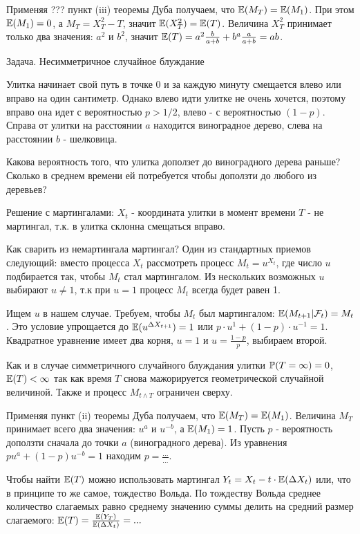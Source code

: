 {Применяя ??? пункт (iii) теоремы Дуба получаем, что $\E(M_{T})=\E(M_{1})$. При этом $\E(M_{1})=0$, а $M_{T}=X_{T}^{2}-T$, значит $\E(X_{T}^{2})=\E(T)$. Величина $X_{T}^{2}$ принимает только два значения: $a^{2}$ и $b^{2}$, значит $\E(T)=a^{2}\frac{b}{a+b}+b^{a}\frac{a}{a+b}=ab$.

Задача. Несимметричное случайное блуждание

Улитка начинает свой путь в точке 0 и за каждую минуту смещается влево или вправо на один сантиметр. Однако влево идти улитке не очень хочется, поэтому вправо она идет с вероятностью $p>1/2$, влево - с вероятностью $(1-p)$. Справа от улитки на расстоянии $a$ находится виноградное дерево, слева на расстоянии $b$ - шелковица.

Какова вероятность того, что улитка доползет до виноградного дерева раньше? Сколько в среднем времени ей потребуется чтобы доползти до любого из деревьев?

Решение с мартингалами: $X_{t}$ - координата улитки в момент времени $T$ - не мартингал, т.к. в улитка склонна смещаться вправо.

Как сварить из немартингала мартингал? Один из стандартных приемов следующий: вместо процесса $X_{t}$ рассмотреть процесс $M_{t}=u^{X_{t}}$, где число $u$ подбирается так, чтобы $M_{t}$ стал мартингалом. Из нескольких возможных $u$ выбирают $u\neq 1$, т.к при $u=1$ процесс $M_{t}$ всегда будет равен 1.

Ищем $u$ в нашем случае. Требуем, чтобы $M_{t}$ был мартингалом: $\E(M_{t+1}|\mathcal{F}_{t})=M_{t}$. Это условие упрощается до $\E(u^{\Delta{X}_{t+1}})=1$ или $p\cdot u^{1}+(1-p)\cdot u^{-1}=1$.
Квадратное уравнение имеет два корня, $u=1$ и $u=\frac{1-p}{p}$, выбираем второй.

Как и в случае симметричного случайного блуждания улитки $\P(T=\infty)=0$, $\E(T)<\infty$ так как время $T$ снова мажорируется геометрической случайной величиной. Также и процесс $M_{t\wedge T}$ ограничен сверху.

Применяя пункт (ii) теоремы Дуба получаем, что $\E(M_{T})=\E(M_{1})$. Величина $M_{T}$ принимает всего два значения: $u^{a}$ и $u^{-b}$, а $\E(M_{1})=1$. Пусть $p$ - вероятность доползти сначала до точки $a$ (виноградного дерева). Из уравнения $pu^{a}+(1-p)u^{-b}=1$ находим $p=\frac{...}{...}$.

Чтобы найти $\E(T)$ можно использовать мартингал $Y_{t}=X_{t}-t\cdot \E(\Delta X_{t})$ или, что в принципе то же самое, тождество Вольда. По тождеству Вольда среднее количество слагаемых равно среднему значению суммы делить на средний размер слагаемого: $\E(T)=\frac{\E(Y_{T})}{\E(\Delta X_{t})}=...$


}

